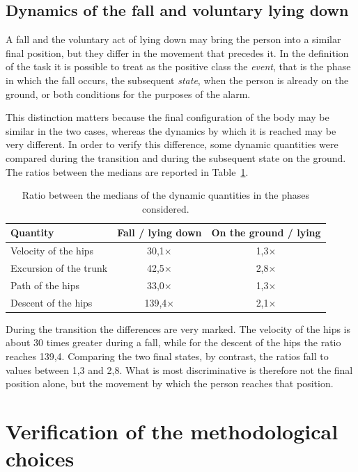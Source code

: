 \subsection{Dynamics of the fall and voluntary lying down}

A fall and the voluntary act of lying down may bring the person into a similar final position, but they differ in the movement that precedes it.
In the definition of the task it is possible to treat as the positive class the \emph{event}, that is the phase in which the fall occurs, the subsequent \emph{state}, when the person is already on the ground, or both conditions for the purposes of the alarm.

This distinction matters because the final configuration of the body may be similar in the two cases, whereas the dynamics by which it is reached may be very different. In order to verify this difference, some dynamic quantities were compared during the transition and during the subsequent state on the ground. The ratios between the medians are reported in Table~\ref{tab:dinamica}.

\begin{table}[htbp]
\centering
\caption{Ratio between the medians of the dynamic quantities in the phases considered.}
\label{tab:dinamica}
\begin{tabular}{lcc}
\toprule
\textbf{Quantity} &
\textbf{Fall / lying down} &
\textbf{On the ground / lying} \\
\midrule Velocity of the hips & 30,1$\times$ & 1,3$\times$ \\
Excursion of the trunk & 42,5$\times$ & 2,8$\times$ \\
Path of the hips & 33,0$\times$ & 1,3$\times$ \\
Descent of the hips & 139,4$\times$ & 2,1$\times$ \\
\bottomrule
\end{tabular}
\end{table}

During the transition the differences are very marked. The velocity of the hips is about 30 times greater during a fall, while for the descent of the hips the ratio reaches 139,4. Comparing the two final states, by contrast, the ratios fall to values between 1,3 and 2,8. What is most discriminative is therefore not the final position alone, but the movement by which the person reaches that position.

\section{Verification of the methodological choices}
\label{sec:misura_leakage}


